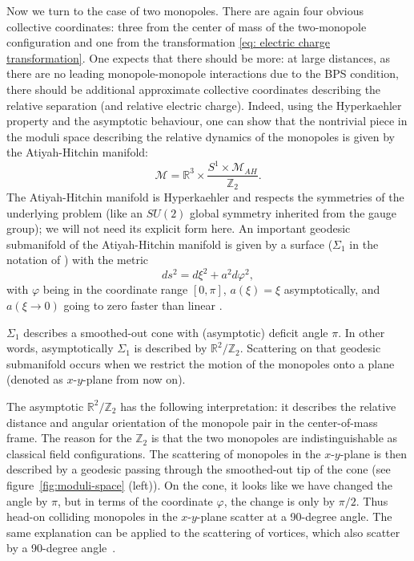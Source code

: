 \documentclass[aps, prd, twocolumn, superscriptaddress, preprintnumbers, nofootinbib, longbibliography]{revtex4-1}
\begin{document}
Now we turn to the case of two monopoles. There are again four obvious collective coordinates: three from the center of mass of the two-monopole configuration and one from the transformation \eqref{eq: electric charge transformation}. One expects that there should be more: at large distances, as there are no leading monopole-monopole interactions due to the BPS condition, there should be additional approximate collective coordinates describing the relative separation (and relative electric charge). Indeed, using the Hyperkaehler property and the asymptotic behaviour, one can show \cite{Atiyah-Hitchin1988,Manton:2004tk} that the nontrivial piece in the moduli space describing the relative dynamics of the monopoles is given by the Atiyah-Hitchin manifold:
\begin{equation}
    \mathcal{M} = \mathbb{R}^3 \times \frac{S^1 \times \mathcal{M}_{AH}}{\mathbb{Z}_2}.
\end{equation}
The Atiyah-Hitchin manifold is Hyperkaehler and respects the symmetries of the underlying problem (like an $SU(2)$ global symmetry inherited from the gauge group); we will not need its explicit form here.
An important geodesic submanifold of the Atiyah-Hitchin manifold is given by a surface ($\Sigma_1$ in the notation of \cite{Atiyah-Hitchin1988}) with the metric
\begin{equation}
    ds^2 = d\xi^2 + a^2 d\varphi^2,
\end{equation}
with $\varphi$ being in the coordinate range $[0,\pi]$, $a(\xi) = \xi$ asymptotically, and $a(\xi \rightarrow 0)$ going to zero faster than linear \cite{Atiyah-Hitchin1988}. 

$\Sigma_1$ describes a smoothed-out cone with (asymptotic) deficit angle $\pi$. In other words, asymptotically $\Sigma_1$ is described by $\mathbb{R}^2/\mathbb{Z}_2$. Scattering on that geodesic submanifold occurs when we restrict the motion of the monopoles onto a plane (denoted as $x$-$y$-plane from now on). 

The asymptotic $\mathbb{R}^2/\mathbb{Z}_2$ has the following interpretation: it describes the relative distance and angular orientation of the monopole pair in the center-of-mass frame. The reason for the $\mathbb{Z}_2$ is that the two monopoles are indistinguishable as classical field configurations. The scattering of monopoles in the $x$-$y$-plane is then described by a geodesic passing through the smoothed-out tip of the cone (see figure~\ref{fig:moduli-space} (left)). On the cone, it looks like we have changed the angle by $\pi$, but in terms of the coordinate $\varphi$, the change is only by $\pi/2$. Thus head-on colliding monopoles in the $x$-$y$-plane scatter at a 90-degree angle. The same explanation can be applied to the scattering of vortices, which also scatter by a 90-degree angle~\cite{Samols:1991ne}.
\end{document}
